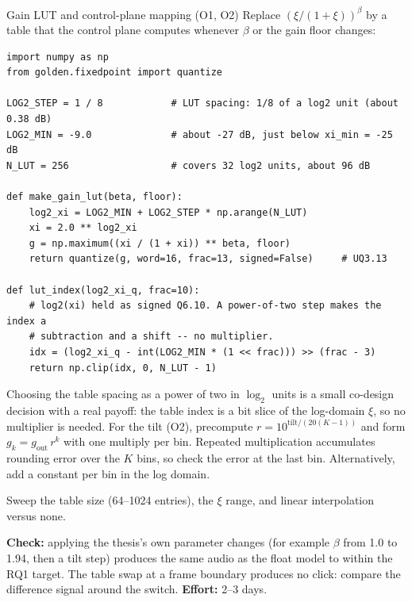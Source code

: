 \begin{stepbox}[label=st:codesign:lut]{Gain LUT and control-plane mapping (O1, O2)}
Replace $(\xi/(1+\xi))^\beta$ by a table that the control plane computes
whenever $\beta$ or the gain floor changes:

\begin{lstlisting}[style=py,caption={Gain table generation (control plane) and lookup (data plane).}]
import numpy as np
from golden.fixedpoint import quantize

LOG2_STEP = 1 / 8            # LUT spacing: 1/8 of a log2 unit (about 0.38 dB)
LOG2_MIN = -9.0              # about -27 dB, just below xi_min = -25 dB
N_LUT = 256                  # covers 32 log2 units, about 96 dB

def make_gain_lut(beta, floor):
    log2_xi = LOG2_MIN + LOG2_STEP * np.arange(N_LUT)
    xi = 2.0 ** log2_xi
    g = np.maximum((xi / (1 + xi)) ** beta, floor)
    return quantize(g, word=16, frac=13, signed=False)     # UQ3.13

def lut_index(log2_xi_q, frac=10):
    # log2(xi) held as signed Q6.10. A power-of-two step makes the index a
    # subtraction and a shift -- no multiplier.
    idx = (log2_xi_q - int(LOG2_MIN * (1 << frac))) >> (frac - 3)
    return np.clip(idx, 0, N_LUT - 1)
\end{lstlisting}

Choosing the table spacing as a power of two in $\log_2$ units is a small
co-design decision with a real payoff: the table index is a bit slice of the
log-domain $\xi$, so no multiplier is needed. For the tilt (O2), precompute
$r=10^{\text{tilt}/(20(K-1))}$ and form $g_k=g_\text{out}\,r^k$ with one multiply
per bin. Repeated multiplication accumulates rounding error over the $K$ bins,
so check the error at the last bin. Alternatively, add a constant per bin in the
log domain.

Sweep the table size (64--1024 entries), the $\xi$ range, and linear
interpolation versus none.

\textbf{Check:} applying the thesis's own parameter changes (for example
$\beta$ from 1.0 to 1.94, then a tilt step) produces the same audio as the float
model to within the RQ1 target. The table swap at a frame boundary produces no
click: compare the difference signal around the switch.
\textbf{Effort:} 2--3 days.
\end{stepbox}

